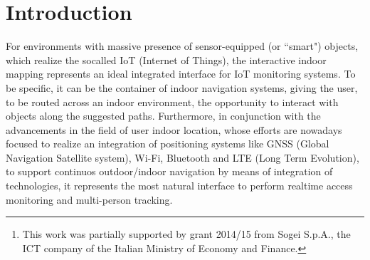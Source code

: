 \documentclass{sig-alternate}
\begin{document}
\date{23 March 2015}
\maketitle


\begin{abstract}
This paper introduces HiJson\footnote{This work was partially supported by grant 2014/15 from Sogei S.p.A., the ICT company of the Italian Ministry of Economy and Finance.}, a novel indoor cartographic document format. A software framework is also presented, that relies on HiJson documents and is entirely based on web technologies. With respect to current cartographic formats, HiJson suggests four major enhancements: (a) exposes a hierarchical structure; (b) uses local metric coordinate systems; (c) may import external geometric models; (d) accepts semantic extensions. The semantic extensions supported by the HiJson framework architecture encapsulate the details about communication protocols, rendering style, and exchanged and displayed information, allowing the HiJson format to be extended with any sort of models of objects, sensors or behaviors.
\end{abstract}


\section{Introduction}

For environments with massive presence of sensor-equipped (or ``smart") objects, which realize the socalled IoT (Internet of Things), the interactive indoor mapping represents an ideal integrated interface for IoT monitoring systems. To be specific, it can be the container of indoor navigation systems, giving the user, to be routed across an indoor environment, the opportunity to interact with objects along the suggested paths. Furthermore, in conjunction with the advancements in the field of user indoor location, whose efforts are nowadays focused to realize an integration of positioning systems like GNSS (Global Navigation Satellite system), Wi-Fi, Bluetooth and LTE (Long Term Evolution), to support continuos outdoor/indoor navigation by means of integration of technologies, it represents the most natural interface to perform realtime access monitoring and multi-person tracking.
\end{document}
